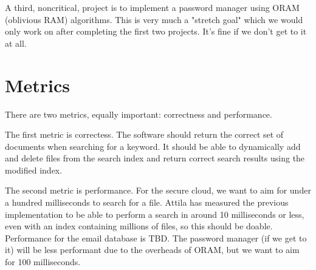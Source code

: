 \documentclass[onecolumn, draftclsnofoot,10pt, compsoc]{IEEEtran}
\begin{document}



A third, noncritical, project is to implement a password manager using ORAM (oblivious RAM) algorithms.
This is very much a "stretch goal" which we would only work on after completing the first two projects.
It's fine if we don't get to it at all.


\section{Metrics}

There are two metrics, equally important: correctness and performance.


The first metric is correctess.
The software should return the correct set of documents when searching for a keyword.
It should be able to dynamically add and delete files from the search index and return correct search results using the modified index.


The second metric is performance.
For the secure cloud, we want to aim for under a hundred milliseconds to search for a file. %
Attila has measured the previous implementation to be able to perform a search in around 10 milliseconds or less, even with an index containing millions of files, so this should be doable.
Performance for the email database is TBD.
The password manager (if we get to it) will be less performant due to the overheads of ORAM, but we want to aim for 100 milliseconds.


{}
\end{document}
